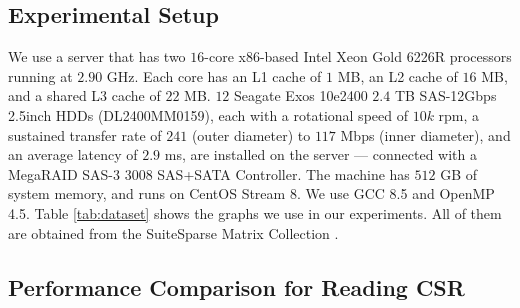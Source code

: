 \subsection{Experimental Setup}
\label{sec:setup}

We use a server that has two $16$-core x86-based Intel Xeon Gold 6226R processors running at $2.90$ GHz. Each core has an L1 cache of $1$ MB, an L2 cache of $16$ MB, and a shared L3 cache of $22$ MB. $12$ Seagate Exos 10e2400 $2.4$ TB SAS-12Gbps 2.5inch HDDs (DL2400MM0159), each with a rotational speed of $10k$ rpm, a sustained transfer rate of $241$ (outer diameter) to $117$ Mbps (inner diameter), and an average latency of $2.9$ ms, are installed on the server --- connected with a MegaRAID SAS-3 3008 SAS+SATA Controller. The machine has $512$ GB of system memory, and runs on CentOS Stream 8. We use GCC 8.5 and OpenMP 4.5. Table \ref{tab:dataset} shows the graphs we use in our experiments. All of them are obtained from the SuiteSparse Matrix Collection \cite{kolodziej2019suitesparse}.






\subsection{Performance Comparison for Reading CSR}

